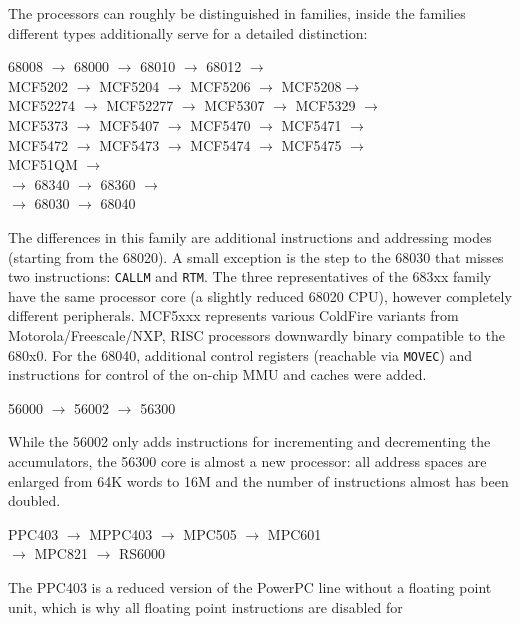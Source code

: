 \documentclass[12pt,twoside]{report}
\newcommand{\tty}[1]{{\tt #1}}
\begin{document}
The processors can roughly be distinguished in families, inside the
families different types additionally serve for a detailed
distinction:
\begin{cpulist}
   68008 $\rightarrow$ 68000 $\rightarrow$ 68010 $\rightarrow$ 68012 $\rightarrow$ \\
\> MCF5202 $\rightarrow$ MCF5204 $\rightarrow$ MCF5206 $\rightarrow$ MCF5208$\rightarrow$ \\
\> MCF52274 $\rightarrow$ MCF52277 $\rightarrow$ MCF5307 $\rightarrow$ MCF5329 $\rightarrow$ \\
\> MCF5373 $\rightarrow$ MCF5407 $\rightarrow$ MCF5470 $\rightarrow$ MCF5471 $\rightarrow$ \\
\> MCF5472 $\rightarrow$ MCF5473 $\rightarrow$ MCF5474 $\rightarrow$ MCF5475 $\rightarrow$ \\
\> MCF51QM $\rightarrow$ \\
 $\rightarrow$ 68340 $\rightarrow$ 68360 $\rightarrow$ \\
 $\rightarrow$ 68030 $\rightarrow$ 68040
\end{cpulist}
The differences in this family are additional instructions and
addressing modes (starting from the 68020).  A small exception is the step
to the 68030 that misses two instructions: \tty{CALLM} and \tty{RTM}.  The
three representatives of the 683xx family have the same processor core (a
slightly reduced 68020 CPU), however completely different peripherals.
MCF5xxx represents various ColdFire variants from Motorola/Freescale/NXP,
RISC processors downwardly binary compatible to the 680x0.  For the 68040,
additional control registers (reachable via \tty{MOVEC}) and instructions
for control of the on-chip MMU and caches were added.
\begin{cpulist}
   56000 $\longrightarrow$ 56002 $\longrightarrow$ 56300
\end{cpulist}
While the 56002 only adds instructions for incrementing and decrementing
the accumulators, the 56300 core is almost a new processor: all address
spaces are enlarged from 64K words to 16M and the number of instructions
almost has been doubled.
\begin{cpulist}
   PPC403 $\rightarrow$ MPPC403 $\rightarrow$ MPC505 $\rightarrow$ MPC601 \\
\> $\rightarrow$ MPC821 $\rightarrow$ RS6000
\end{cpulist}
The PPC403 is a reduced version of the PowerPC line without a floating
point unit, which is why all floating point instructions are disabled for
\end{document}
